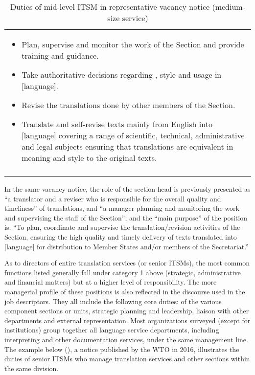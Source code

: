 \documentclass[output=paper]{langsci/langscibook}
\begin{document}
\begin{table}
\footnotesize
\begin{tabularx}{\textwidth}{Q}
 \lsptoprule
 \parbox{.9\textwidth}{

\begin{itemize} 
  \item 
  Plan, supervise and monitor the work of the Section and provide training and guidance.
  \item 
  Take authoritative decisions regarding , style and usage in [language].
  \item 
  Revise the translations done by other members of the Section.
  \item 
  Translate and self-revise texts mainly from English into [language] covering a range of scientific, technical, administrative and legal subjects ensuring that translations are equivalent in meaning and style to the original texts.
  \end{itemize} 
 }\\
 \lspbottomrule
\end{tabularx}
\caption{Duties of mid-level ITSM in representative vacancy notice (medium-size service)}
\label{tab:prieto:2}
\end{table}


In the same vacancy notice, the role of the section head is previously presented as “a translator and a reviser who is responsible for the overall quality and timeliness” of translations, and “a manager planning and monitoring the work and supervising the staff of the Section”; and the “main purpose” of the position is: “To plan, coordinate and supervise the translation/revision activities of the Section, ensuring the high quality and timely delivery of texts translated into [language] for distribution to Member States and/or members of the Secretariat.”



As to directors of entire translation services (or senior ITSMs), the most common functions listed generally fall under category 1 above (strategic, administrative and financial matters) but at a higher level of responsibility. The more managerial profile of these positions is also reflected in the discourse used in the job descriptors. They all include the following core duties:  of the various component sections or units, strategic planning and leadership, liaison with other departments and external representation. Most organizations surveyed (except for  institutions) group together all language service departments, including interpreting and other documentation services, under the same management line. The example below (), a notice published by the WTO in 2016, illustrates the duties of senior ITSMs who manage translation services and other sections within the same division. 
\end{document}
